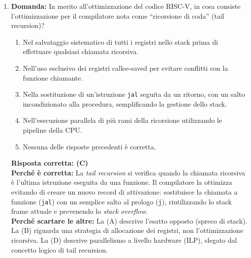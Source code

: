 \documentclass[12pt, a4paper]{article}
\begin{document}
\begin{enumerate}
    \item \textbf{Domanda:} In merito all'ottimizzazione del codice RISC-V, in cosa consiste l'ottimizzazione per il compilatore nota come ``ricorsione di coda'' (tail recursion)?
    \begin{enumerate}[label=(\Alph*)]
        \item Nel salvataggio sistematico di tutti i registri nello stack prima di effettuare qualsiasi chiamata ricorsiva.
        \item Nell'uso esclusivo dei registri callee-saved per evitare conflitti con la funzione chiamante.
        \item Nella sostituzione di un'istruzione \texttt{jal} seguita da un ritorno, con un salto incondizionato alla procedura, semplificando la gestione dello stack.
        \item Nell'esecuzione parallela di più rami della ricorsione utilizzando le pipeline della CPU.
        \item Nessuna delle risposte precedenti è corretta.
    \end{enumerate}
    \textbf{Risposta corretta: (C)} \\
    \textbf{Perché è corretta:} La \textit{tail recursion} si verifica quando la chiamata ricorsiva è l'ultima istruzione eseguita da una funzione. Il compilatore la ottimizza evitando di creare un nuovo record di attivazione: sostituisce la chiamata a funzione (\texttt{jal}) con un semplice salto al prologo (\texttt{j}), riutilizzando lo stack frame attuale e prevenendo lo \textit{stack overflow}. \\
    \textbf{Perché scartare le altre:} La (A) descrive l'esatto opposto (spreco di stack). La (B) riguarda una strategia di allocazione dei registri, non l'ottimizzazione ricorsiva. La (D) descrive parallelismo a livello hardware (ILP), slegato dal concetto logico di tail recursion.


\end{enumerate}
\end{document}
